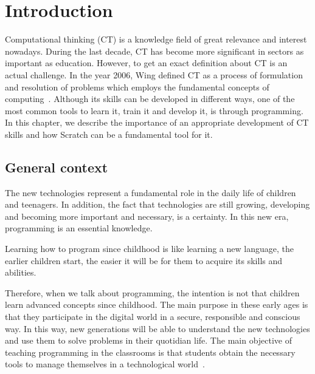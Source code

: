 

\cleardoublepage
\chapter{Introduction}
\label{chap:introduction}

Computational thinking (CT) is a knowledge field of great relevance and interest nowadays. During the last decade, CT has become more significant in sectors as important as education. However, to get an exact definition about CT is an actual challenge. In the year 2006, Wing defined CT as a process of formulation and resolution of problems which employs the fundamental concepts of computing~\cite{wing:_ct}. Although its skills can be developed in different ways, one of the most common tools to learn it, train it and develop it, is through programming. In this chapter, we describe the importance of an appropriate development of CT skills and how Scratch can be a fundamental tool for it. 


\section{General context}
\label{sec:context}

The new technologies represent a fundamental role in the daily life of children and teenagers. In addition, the fact that technologies are still growing, developing and becoming more important and necessary, is a certainty. In this new era, programming is an essential knowledge. 

Learning how to program since childhood is like learning a new language, the earlier children start, the easier it will be for them to acquire its skills and abilities.

Therefore, when we talk about programming, the intention is not that children learn advanced concepts since childhood. The main purpose in these early ages is that they participate in the digital world in a secure, responsible and conscious way. In this way, new generations will be able to understand the new technologies and use them to solve problems in their quotidian life. The main objective of teaching programming in the classrooms is that students obtain the necessary tools to manage themselves in a technological world~\cite{mangifesta:_importancia}. 

